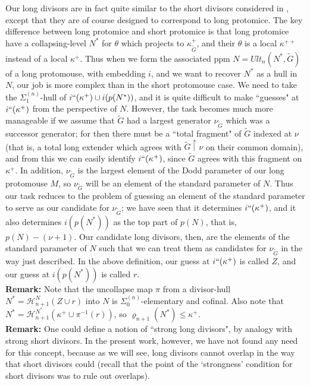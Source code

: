 \documentclass[12pt]{article}
\begin{document}
Our long divisors are in fact quite similar to the short divisors considered in \cite{zeman square proof}, except that they are of course designed to correspond to long protomice.  The key difference between long protomice and short protomice is that long protomice have a collapsing-level $N^*$ for $\theta$ which projects to $\kappa_{\tilde{G}}^+$, and their $\theta$ is a local $\kappa^{++}$ instead of a local $\kappa^+$.  Thus when we form the associated ppm $N = Ult_n (N^* , \tilde{G})$ of a long protomouse, with embedding $i$, and we want to recover $N^*$ as a hull in $N$, our job is more complex than in the short protomouse case.  We need to take the $\Sigma_1^{(n)}$-hull of $i``(\kappa^+ ) \cup i(p(N^*))$, and it is quite difficult to make ``guesses" at $i``(\kappa^+ )$ from the perspective of $N$.  However, the task becomes much more manageable if we assume that $\tilde{G}$ had a largest generator $\nu_{\tilde{G}}$ which was a successor generator; for then there must be a ``total fragment" of $\tilde{G}$ indexed at $\nu$ (that is, a total long extender which agrees with $\tilde{G} \restriction \nu$ on their common domain), and from this we can easily identify $i``(\kappa^+ )$, since $\tilde{G}$ agrees with this fragment on $\kappa^+$.  In addition, $\nu_{\tilde{G}}$ is the largest element of the Dodd parameter of our long protomouse $M$, so $\nu_{\tilde{G}}$ will be an element of the standard parameter of $N$.  Thus our task reduces to the problem of guessing an element of the standard parameter to serve as our candidate for $\nu_{\tilde{G}}$; we have seen that it determines $i``(\kappa^+ )$, and it also determines $i(p(N^*))$ as the top part of $p(N)$, that is, $p(N) - (\nu+1 )$.  Our candidate long divisors, then, are the elements of the standard parameter of $N$ such that we can treat them as candidates for $\nu_{\tilde{G}}$ in the way just described.  In the above definition, our guess at $i``(\kappa^+ )$ is called $Z$, and our guess at $i(p(N^*))$ is called $r$.\\

\textbf{Remark:} Note that the uncollapse map $\pi$ from a divisor-hull $N^* = \mathcal{H}_{n+1}^N ( Z \cup r )$ into $N$ is $\Sigma_0^{(n)}$-elementary and cofinal.  Also note that $N^* = \mathcal{H}_{n+1}^{N^*} (\kappa^+ \cup \pi^{-1}(r))$, so $\varrho_{n+1}(N^*) \leq \kappa^+$.\\

\textbf{Remark:} One could define a notion of ``strong long divisors", by analogy with strong short divisors.  In the present work, however, we have not found any need for this concept, because as we will see, long divisors cannot overlap in the way that short divisors could (recall that the point of the `strongness' condition for short divisors was to rule out overlaps).\\
\end{document}
